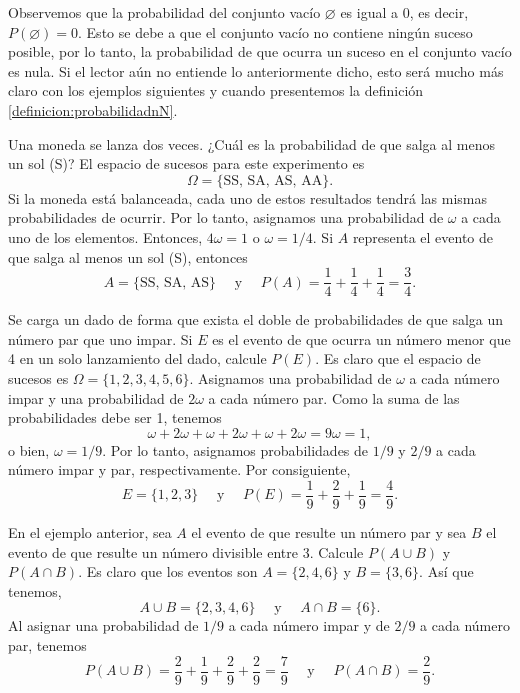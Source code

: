 Observemos que la probabilidad del conjunto vacío $\varnothing$ es igual a 0, es decir, $P(\varnothing) = 0$. Esto se debe a que el conjunto vacío no contiene ningún suceso posible, por lo tanto, la probabilidad de que ocurra un suceso en el conjunto vacío es nula. Si el lector aún no entiende lo anteriormente dicho, esto será mucho más claro con los ejemplos siguientes y cuando presentemos la definición \ref{definicion:probabilidadnN}.

\begin{examplebox}{}{}
    Una moneda se lanza dos veces. ¿Cuál es la probabilidad de que salga al menos un sol (S)?
    \tcblower
    \solucion El espacio de sucesos para este experimento es
    $$\Omega = \{ \text{SS, SA, AS, AA} \}.$$
    Si la moneda está balanceada, cada uno de estos resultados tendrá las mismas probabilidades de ocurrir. Por lo tanto, asignamos una probabilidad de $\omega$ a cada uno de los elementos. Entonces, $4\omega = 1$ o $\omega = 1/4$. Si $A$ representa el evento de que salga al menos un sol (S), entonces
    $$A = \{ \text{SS, SA, AS} \} \quad \text{ y } \quad P(A) = \frac{1}{4} + \frac{1}{4} + \frac{1}{4} = \frac{3}{4}.$$
\end{examplebox}

\begin{examplebox}{}{}
    Se carga un dado de forma que exista el doble de probabilidades de que salga un número par que uno impar. Si $E$ es el evento de que ocurra un número menor que 4 en un solo lanzamiento del dado, calcule $P(E)$.
    \tcblower
    \solucion Es claro que el espacio de sucesos es $\Omega = \{1, 2, 3, 4, 5, 6\}$. Asignamos una probabilidad de $\omega$ a cada número impar y una probabilidad de $2\omega$ a cada número par. Como la suma de las probabilidades debe ser 1, tenemos
    $$\omega + 2\omega + \omega + 2\omega + \omega + 2\omega = 9\omega = 1,$$
    o bien, $\omega = 1/9$. Por lo tanto, asignamos probabilidades de $1/9$ y $2/9$ a cada número impar y par, respectivamente. Por consiguiente,
    $$E = \{ 1, 2, 3 \} \quad \text{ y } \quad P(E) = \frac{1}{9} + \frac{2}{9} + \frac{1}{9} = \frac{4}{9}.$$
\end{examplebox}

\newpage

\begin{examplebox}{}{}
    En el ejemplo anterior, sea $A$ el evento de que resulte un número par y sea $B$ el evento de que resulte un número divisible entre 3. Calcule $P(A \cup B)$ y $P(A \cap B)$.
    \tcblower
    \solucion Es claro que los eventos son $A = \{2, 4, 6\}$ y $B = \{3, 6\}$. Así que tenemos,
    $$A \cup B = \{ 2, 3, 4, 6 \} \quad \text{ y } \quad A \cap B = \{ 6 \}.$$
    Al asignar una probabilidad de $1/9$ a cada número impar y de $2/9$ a cada número par, tenemos
    $$P(A \cup B) = \frac{2}{9} + \frac{1}{9} + \frac{2}{9} + \frac{2}{9} = \frac{7}{9} \quad \text{ y } \quad P(A \cap B) = \frac{2}{9}.$$
\end{examplebox}

